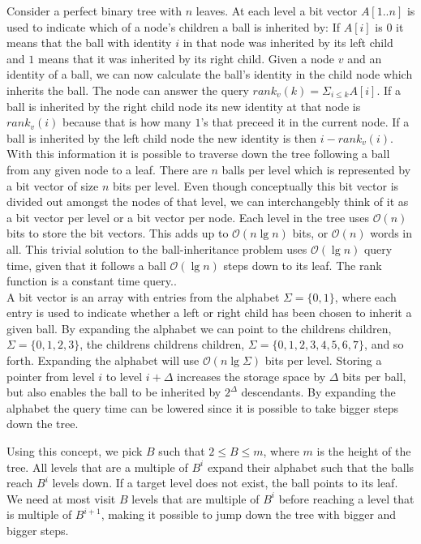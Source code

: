 Consider a perfect binary tree with $n$ leaves. At each level a bit vector $A[1..n]$ is used to indicate which of a node's children a ball is inherited by: If $A[i]$ is $0$ it means that the ball with identity $i$ in that node was inherited by its left child and $1$ means that it was inherited by its right child. Given a node $v$ and an identity of a ball, we can now calculate the ball's identity in the child node which inherits the ball. The node can answer the query $rank_v(k) = \Sigma_{i \leq k} A[i]$. If a ball is inherited by the right child node its new identity at that node is $rank_v(i)$ because that is how many $1$'s that preceed it in the current node. If a ball is inherited by the left child node the new identity is then $i-rank_v(i)$. With this information it is possible to traverse down the tree following a ball from any given node to a leaf. There are $n$ balls per level which is represented by a bit vector of size $n$ bits per level. Even though conceptually this bit vector is divided out amongst the nodes of that level, we can interchangebly think of it as a bit vector per level or a bit vector per node. Each level in the tree uses $\mathcal{O}(n)$ bits to store the bit vectors. This adds up to $\mathcal{O}(n \lg n)$ bits, or $\mathcal{O}(n)$ words in all. This trivial solution to the ball-inheritance problem uses $\mathcal{O}(\lg n)$ query time, given that it follows a ball $\mathcal{O}(\lg n)$ steps down to its leaf. The rank function is a constant time query.. \\


A bit vector is an array with entries from the alphabet $\Sigma = \{0,1\}$, where each entry is used to indicate whether a left or right child has been chosen to inherit a given ball. By expanding the alphabet we can point to the childrens children, $\Sigma = \{0,1,2,3\}$, the childrens childrens children, $\Sigma = \{0,1,2,3,4,5,6,7\}$, and so forth. Expanding the alphabet will use $\mathcal{O}(n \lg \Sigma)$ bits per level. Storing a pointer from level $i$ to level $i+\Delta$ increases the storage space by $\Delta$ bits per ball, but also enables the ball to be inherited by $2^\Delta$ descendants. By expanding the alphabet the query time can be lowered since it is possible to take bigger steps down the tree. 

Using this concept, we pick $B$ such that $2 \leq B \leq m$, where $m$ is the height of the tree. All levels that are a multiple of $B^i$ expand their alphabet such that the balls reach $B^i$ levels down. If a target level does not exist, the ball points to its leaf. We need at most visit $B$ levels that are multiple of $B^i$ before reaching a level that is multiple of $B^{i+1}$, making it possible to jump down the tree with bigger and bigger steps.

